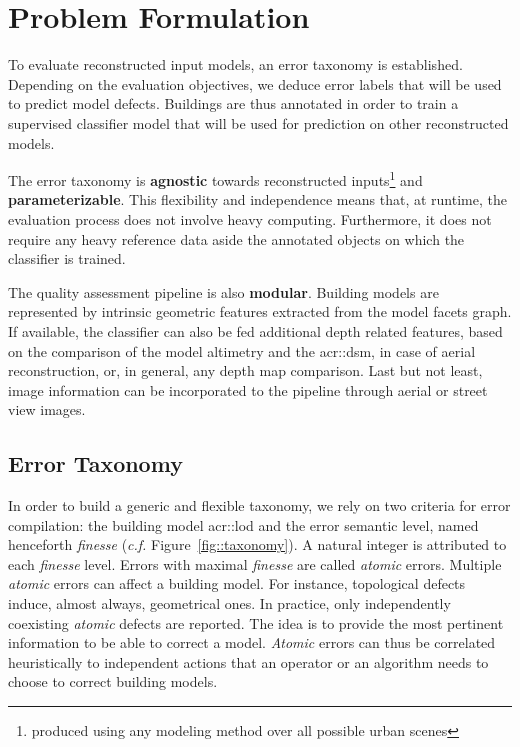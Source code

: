 \documentclass[runningheads]{llncs}
\begin{document}
\section{Problem Formulation}

To evaluate reconstructed input models, an error taxonomy is established. Depending on the evaluation objectives, we deduce error labels that will be used to predict model defects. Buildings are thus annotated in order to train a supervised classifier model that will be used for prediction on other reconstructed models.

The error taxonomy is \textbf{agnostic} towards reconstructed inputs\footnote{produced using any modeling method over all possible urban scenes} and \textbf{parameterizable}. This flexibility and independence means that, at runtime, the evaluation process does not involve heavy computing. Furthermore, it does not require any heavy reference data aside the annotated objects on which the classifier is trained.

The quality assessment pipeline is also \textbf{modular}. Building models are represented by intrinsic geometric features extracted from the model facets graph. If available, the classifier can also be fed additional depth related features, based on the comparison of the model altimetry and the \acrshort{acr::dsm}, in case of aerial reconstruction, or, in general, any depth map comparison. Last but not least, image information can be incorporated to the pipeline through aerial or street view images.

\subsection{Error Taxonomy}
In order to build a generic and flexible taxonomy, we rely on two criteria for error compilation: the building model \acrshort{acr::lod} and the error semantic level, named henceforth \textit{finesse} (\textit{c.f.} Figure~\ref{fig::taxonomy}). A natural integer is attributed to each \textit{finesse} level. Errors with maximal \textit{finesse} are called \textit{atomic} errors. Multiple \textit{atomic} errors can affect a building model. For instance, topological defects induce, almost always, geometrical ones. In practice, only independently coexisting \textit{atomic} defects are reported. The idea is to provide the most pertinent information to be able to correct a model. \textit{Atomic} errors can thus be correlated heuristically to independent actions that an operator or an algorithm needs to choose to correct building models.
\end{document}
